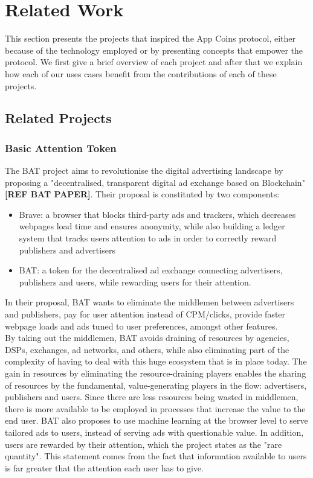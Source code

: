 \section{Related Work}

This section presents the projects that inspired the App Coins protocol, either because of the technology employed or by presenting concepts that empower the protocol. We first give a brief overview of each project and after that we explain how each of our uses cases benefit from the contributions of each of these projects.

\subsection{Related Projects}
\subsubsection{Basic Attention Token}

The BAT project aims to revolutionise the digital advertising landscape by proposing a "decentralised, transparent digital ad exchange based on Blockchain" \textbf{[REF BAT PAPER]}. Their proposal is constituted by two components:
\begin{itemize}
	\item Brave: a browser that blocks third-party ads and trackers, which decreases webpages load time and ensures anonymity, while also building a ledger system that tracks users attention to ads in order to correctly reward publishers and advertisers
	\item BAT: a token for the decentralised ad exchange connecting advertisers, publishers and users, while rewarding users for their attention.
\end{itemize}

In their proposal, BAT wants to eliminate the middlemen between advertisers and publishers, pay for user attention instead of CPM/clicks, provide faster webpage loads and ads tuned to user preferences, amongst other features. \\

By taking out the middlemen, BAT avoids draining of resources by agencies, DSPs, exchanges, ad networks, and others, while also eliminating part of the complexity of having to deal with this huge ecosystem that is in place today. The gain in resources by eliminating the resource-draining players enables the sharing of resources by the fundamental, value-generating  players in the flow: advertisers, publishers and users. Since there are less resources being wasted in middlemen, there is more available to be employed in processes that increase the value to the end user. BAT also proposes to use machine learning at the browser level to serve tailored ads to users, instead of serving ads with questionable value. In addition, users are rewarded by their attention, which the project states as the "rare quantity". This statement comes from the fact that information available to users is far greater that the attention each user has to give. \\

